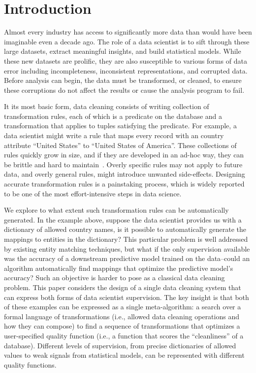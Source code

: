\section{Introduction}\label{intro}\sloppy
Almost every industry has access to significantly more data than would have been imaginable even a decade ago.
The role of a data scientist is to sift through these large datasets, extract meaningful insights, and build statistical models.
While these new datasets are prolific, they are also susceptible to various forms of data error including incompleteness, inconsistent representations, and corrupted data.
Before analysis can begin, the data must be transformed, or cleaned, to ensure these corruptions do not affect the results or cause the analysis program to fail.

It its most basic form, data cleaning consists of writing collection of transformation rules, each of which is a predicate on the database and a transformation that applies to tuples satisfying the predicate.
For example, a data scientist might write a rule that maps every record with an \textsf{country} attribute ``United States'' to ``United States of America''.
These collections of rules quickly grow in size, and if they are developed in an ad-hoc way, they can be brittle and hard to maintain~\cite{krishnan2016hilda}.
Overly specific rules may not apply to future data, and overly general rules, might introduce unwanted side-effects.
Designing accurate transformation rules is a painstaking process, which is widely reported to be one of the most effort-intensive steps in data science.

We explore to what extent such transformation rules can be automatically generated.
In the example above, suppose the data scientist provides us with a dictionary of allowed country names, is it possible to automatically generate the mappings to entities in the dictionary?
This particular problem is well addressed by existing entity matching techniques, but what if the only supervision available was the accuracy of a downstream predictive model trained on the data--could an algorithm automatically find mappings that optimize the predictive model's accuracy?
Such an objective is harder to pose as a classical data cleaning problem.
This paper considers the design of a single data cleaning system that can express both forms of data scientist supervision.
The key insight is that both of these examples can be expressed as a single meta-algorithm:  a search over a formal language of transformations (i.e., allowed data cleaning operations and how they can compose) to find a sequence of transformations that optimizes a user-specified quality function (i.e., a function that scores the ``cleanliness'' of a database).
Different levels of supervision, from precise dictionaries of allowed values to weak signals from statistical models, can be represented with different quality functions.


